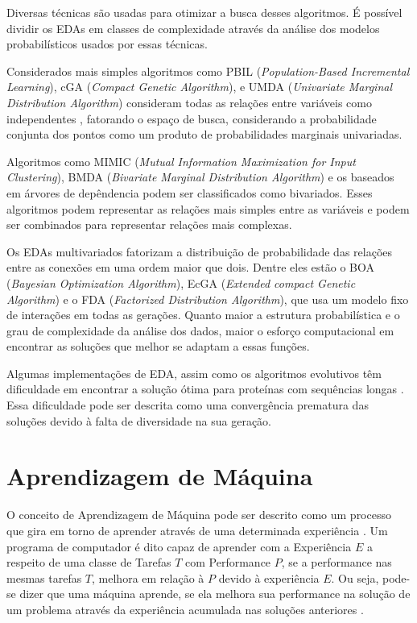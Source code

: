 \documentclass[dm,ppgcomp]{texfurg}
\begin{document}
Diversas técnicas são usadas para otimizar a busca desses algoritmos. É possível dividir os EDAs em classes de complexidade através da análise dos modelos probabilísticos usados por essas técnicas. 

Considerados mais simples algoritmos como PBIL ({\it Population-Based Incremental Learning}), cGA ({\it Compact Genetic Algorithm}), e UMDA ({\it Univariate Marginal Distribution Algorithm}) consideram todas as relações entre variáveis como independentes \cite{armananzas2008review}, fatorando o espaço de busca, considerando a probabilidade conjunta dos pontos como um produto de probabilidades marginais univariadas.

Algoritmos como MIMIC ({\it Mutual Information Maximization for Input Clustering}), BMDA ({\it Bivariate Marginal Distribution Algorithm}) e os baseados em árvores de depêndencia podem ser classificados como bivariados. Esses algoritmos podem representar as relações mais simples entre as variáveis e podem ser combinados para representar relações mais complexas.

Os EDAs multivariados fatorizam a distribuição de probabilidade das relações entre as conexões em uma ordem maior que dois. Dentre eles estão o BOA ({\it Bayesian Optimization Algorithm}), EcGA ({\it Extended compact Genetic Algorithm}) e o FDA ({\it Factorized Distribution Algorithm}), que usa um modelo fixo de interações em todas as gerações. Quanto maior a estrutura probabilística e o grau de complexidade da análise dos dados, maior o esforço computacional em encontrar as soluções que melhor se adaptam a essas funções.

Algumas implementações de EDA, assim como os algoritmos evolutivos têm dificuldade em encontrar a solução ótima para proteínas com sequências longas \cite{chen2009novel}. Essa dificuldade pode ser descrita como uma convergência prematura das soluções devido à falta de diversidade na sua geração. 

\section{Aprendizagem de Máquina}

O conceito de Aprendizagem de Máquina pode ser descrito como um processo que gira em torno de aprender através de uma determinada experiência \cite{anderson1986machine}. Um programa de computador é dito capaz de  aprender com a Experiência $E$ a respeito de uma classe de Tarefas $T$ com Performance $P$, se a performance nas mesmas tarefas $T$, melhora em relação à $P$ devido à experiência $E$. Ou seja, pode-se dizer que uma máquina aprende, se ela melhora sua performance na solução de um problema através da experiência acumulada nas soluções anteriores \cite{anderson1986machine}. 
\end{document}
